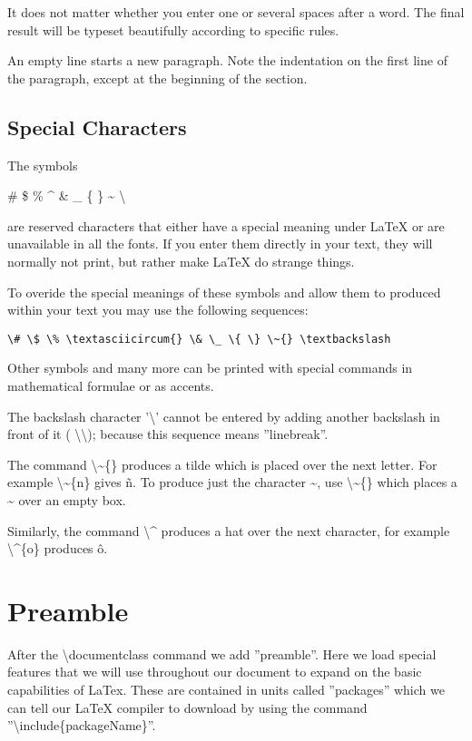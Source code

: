 \vspace*{2ex}
\vspace*{2ex}

It does not matter whether you
enter one or several             spaces
after a word. The final result will be typeset beautifully
according    to     specific rules.




An empty line starts a new
paragraph. Note the indentation on the first line of the paragraph, except at the beginning of the section. 

\pagebreak
\subsection{Special Characters}
The symbols 

\# \$ \% \textasciicircum{} \& \_ \{ \} \~{} \textbackslash

are reserved characters that either have a special meaning under LaTeX or are unavailable in all the fonts. If you enter them directly in your text, they will normally not print, but rather make LaTeX do strange things.

To overide the special meanings of these symbols and allow them to produced within your text you may use the following sequences:
\begin{verbatim}
\# \$ \% \textasciicircum{} \& \_ \{ \} \~{} \textbackslash
\end{verbatim}

Other symbols and many more can be printed with special commands in mathematical formulae or as accents.

The backslash character '\textbackslash' cannot be entered by adding another backslash in front of it ( \textbackslash\textbackslash); because this sequence means ''linebreak''.

The command \textbackslash\~{}\{\} produces a tilde which is placed over the next letter. For example \textbackslash\~{}\{n\} gives \~{n}. To produce just the character \~{}, use \textbackslash\~{}\{\} which places a \~{} over an empty box.

Similarly, the command \textbackslash\textasciicircum{} produces a hat over the next character, for example \textbackslash\textasciicircum\{o\} produces \^{o}.

\pagebreak
\section{Preamble}
After the {\textbackslash}documentclass command we add ''preamble''. Here we load special features that we will use throughout our document to expand on the basic capabilities of LaTex. These are contained in units called ''packages'' which we can tell our LaTeX compiler to download by using the command ''{\textbackslash}include\{packageName\}''. 

